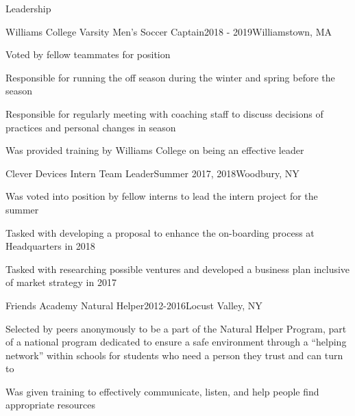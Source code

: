 \documentclass{resume} %
\begin{document}
\begin{rSection}{Leadership}
\begin{rSubsection}{Williams College Varsity Men's Soccer Captain}{2018 - 2019}{}{Williamstown, MA}
\item Voted by fellow teammates for position
\item Responsible for running the off season during the winter and spring before the season
\item Responsible for regularly meeting with coaching staff to discuss decisions of practices and personal changes in season
\item Was provided training by Williams College on being an effective leader
\end{rSubsection}


\begin{rSubsection}{Clever Devices Intern Team Leader}{Summer 2017, 2018}{}{Woodbury, NY}
\item Was voted into position by fellow interns to lead the intern project for the summer
\item Tasked with developing a proposal to enhance the on-boarding process at Headquarters in 2018
\item Tasked with researching possible ventures and developed a business plan inclusive of market strategy in 2017
\end{rSubsection}


\begin{rSubsection}{Friends Academy Natural Helper}{2012-2016}{}{Locust Valley, NY}
\item Selected by peers anonymously to be a part of the Natural Helper Program, part of a national program dedicated to ensure a safe
environment through a “helping network” within schools for students who need a person they trust and can turn to
\item Was given training to effectively communicate, listen, and help people find appropriate resources
\end{rSubsection}
\end{rSection}
\end{document}
